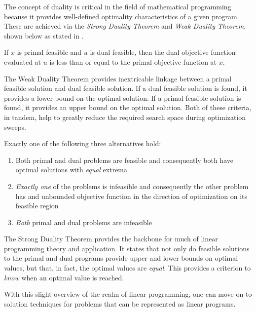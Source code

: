 The concept of duality is critical in the field of mathematical programming
because it provides well-defined optimality characteristics of a given
program. These are achieved via the \textit{Strong Duality Theorem}
and \textit{Weak Duality Theorem}, shown below as stated
in \cite{ferris_linear_2008}.

\begin{thm}
If $x$ is primal feasible and $u$ is dual feasible, then the dual objective
function evaluated at $u$ is less than or equal to the primal objective function
at $x$.
\end{thm}

The Weak Duality Theorem provides inextricable linkage between a primal feasible
solution and dual feasible solution. If a dual feasible solution is found, it
provides a lower bound on the optimal solution. If a primal feasible solution is
found, it provides an upper bound on the optimal solution. Both of these
criteria, in tandem, help to greatly reduce the required search space during
optimization sweeps.

\begin{thm}
Exactly one of the following three alternatives hold:
\begin{enumerate}

  \item Both primal and dual problems are feasible and consequently both have
  optimal solutions with \textit{equal} extrema

  \item \textit{Exactly one} of the problems is infeasible and consequently the
  other problem has and unbounded objective function in the direction of
  optimization on its feasible region

  \item \textit{Both} primal and dual problems are infeasible

\end{enumerate}
\end{thm}

The Strong Duality Theorem provides the backbone for much of linear programming
theory and application. It states that not only do feasible solutions to the
primal and dual programs provide upper and lower bounds on optimal values, but
that, in fact, the optimal values are \textit{equal}. This provides a criterion
to \textit{know} when an optimal value is reached.

With this slight overview of the realm of linear programming, one can move on to
solution techniques for problems that can be represented as linear programs.

